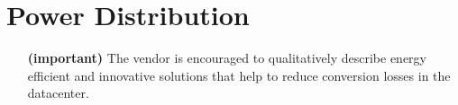\section{Power Distribution}
\begin{itemize}
\item[\textbf{(important)}]
The vendor is encouraged to qualitatively describe energy efficient and innovative 
solutions that help to reduce conversion losses in the datacenter.
\end{itemize}

